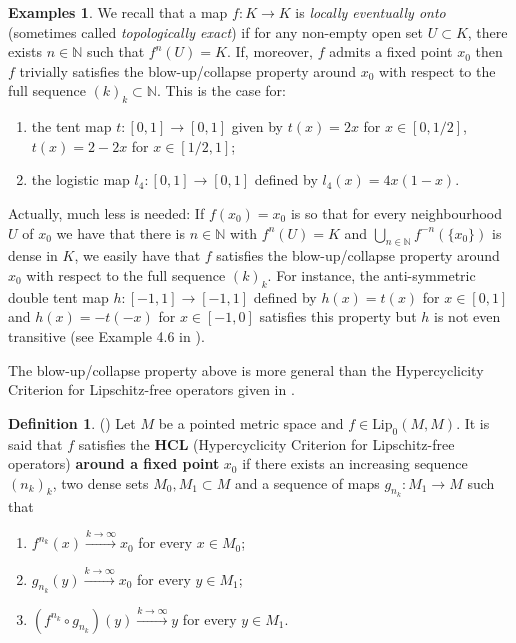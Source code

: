 \documentclass[12pt,english]{amsart}
\numberwithin{equation}{section}
\theoremstyle{plain}
\theoremstyle{definition}
\newtheorem{definition}[theorem]{Definition}
\newtheorem{examples}[theorem]{Examples}
\newcommand{\N}{\mathbb{N}}
\def\NN{\mathbb N}
\def\lip{ \text{Lip}}
\begin{document}
\begin{examples}\label{exa1}
We recall that a map $f\colon K\to K$ is \emph{locally eventually onto} (sometimes called \textit{topologically exact}) if for any non-empty open set $U\subset K$, there exists $n\in\N$ such that $f^n(U)=K$. If, moreover, $f$ admits a fixed point $x_0$ then $f$ trivially satisfies the blow-up/collapse property around $x_0$ with respect to the full sequence $(k)_k\subset \NN$. This is the case for:
\begin{enumerate}
    \item the tent map $t\colon [0,1]\to [0,1]$ given by $t(x)=2x$ for $x\in [0,1/2]$, $t(x)=2-2x$ for $x\in [1/2,1]$;
    \item  the logistic map $l_4\colon[0,1]\to [0,1]$ defined by $l_4(x)=4x(1-x)$.
\end{enumerate}
Actually, much less is needed: If $f(x_0)=x_0$ is so that for every neighbourhood $U$ of $x_0$ we have that there is $n\in\NN$ with $f^n(U)=K$ and $\bigcup_{n\in\NN} f^{-n}(\{x_0\})$ is dense in $K$, we easily have that $f$ satisfies the blow-up/collapse property around $x_0$ with respect to the full sequence $(k)_k$. For instance, the anti-symmetric double tent map $h\colon[-1,1]\to [-1,1]$ defined by $h(x)=t(x)$ for $x\in [0,1]$ and $h(x)=-t(-x)$ for $x\in [-1,0]$ satisfies this property but $h$ is not even transitive (see Example 4.6 in \cite{ACP21}). 
\end{examples}

The blow-up/collapse property above is more general than the Hypercyclicity Criterion for Lipschitz-free operators given in \cite{ACP21}. 

\begin{definition}(\cite[Definition 3.2]{ACP21})
   Let $M$ be a pointed metric space and $f\in \lip_0(M,M)$. It is said that $f$ satisfies the \textbf{HCL} (Hypercyclicity Criterion for Lipschitz-free operators) \textbf{around a fixed point} $x_0$ if there exists an increasing sequence $(n_k)_k$, two dense sets $M_0,M_1\subset M$ and a sequence of maps $g_{n_k}\colon M_1 \to M$ such that 
\begin{enumerate}
    \item $f^{n_k}(x)\xrightarrow{k\to \infty}x_0$ for every $x\in M_0$;
    \item $g_{n_k}(y)\xrightarrow{k\to \infty}x_0$ for every $y\in M_1$;
     \item $(f^{n_k}\circ g_{n_k})(y)\xrightarrow{k\to \infty}y$ for every $y\in M_1$.
\end{enumerate}
\end{definition}
\end{document}
